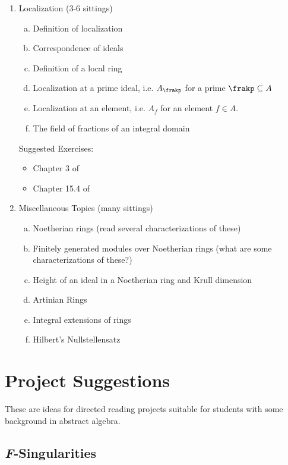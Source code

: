 \begin{enumerate}[(1)]
\begin{itemize}
		\end{itemize}
	\item Localization (3-6 sittings)
		\begin{enumerate}[(a)]
			\item Definition of localization
			\item Correspondence of ideals
			\item Definition of a local ring
			\item Localization at a prime ideal, i.e. $A_\frakp$ for a prime $\frakp \subseteq A$
			\item Localization at an element, i.e. $A_f$ for an element $f \in A$.
			\item The field of fractions of an integral domain
		\end{enumerate}
		Suggested Exercises:
		\begin{itemize}
			\item Chapter 3 of \cite{am}
			\item Chapter 15.4 of \cite{dummit-foote}
		\end{itemize}
	\item Miscellaneous Topics (many sittings)
		\begin{enumerate}[(a)]
			\item Noetherian rings (read several characterizations of these)
			\item Finitely generated modules over Noetherian rings (what are some characterizations of these?)
			\item Height of an ideal in a Noetherian ring and Krull dimension
			\item Artinian Rings
			\item Integral extensions of rings
			\item Hilbert's Nullstellensatz
		\end{enumerate}
\end{enumerate}

\section{Project Suggestions}
These are ideas for directed reading projects suitable for students with some background in abstract algebra.
\subsection{\textit{F}-Singularities}

